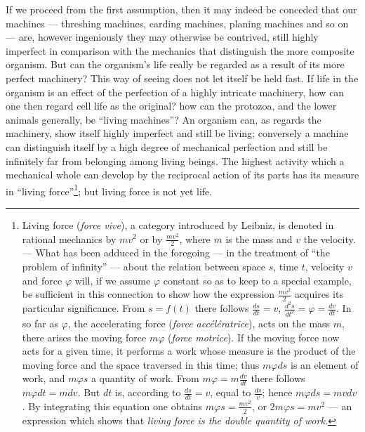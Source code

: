 \documentclass[12pt,a4paper]{book}
\begin{document}
If we proceed from the first assumption, then it may indeed be conceded that our
machines --- threshing machines, carding machines, planing machines and so on ---
are, however ingeniously they may otherwise be contrived, still highly imperfect in
comparison with the mechanics that distinguish the more composite organism. But can
the organism's life really be regarded as a result of its more perfect machinery?
This way of seeing does not let itself be held fast. If life in the organism is an
effect of the perfection of a highly intricate machinery, how can one then regard
cell life as the original? how can the protozoa, and the lower animals generally, be
``living machines''? An organism can, as regards the machinery, show itself highly
imperfect and still be living; conversely a machine can distinguish itself by a high
degree of mechanical perfection and still be infinitely far from belonging among
living beings. The highest activity which a mechanical whole can develop by the
reciprocal action of its parts has its measure in ``living
force''\footnote{Living force (\textit{force vive}), a category introduced by
Leibniz, is denoted in rational mechanics by $mv^2$ or by $\frac{mv^2}{2}$, where
$m$ is the mass and $v$ the velocity. --- What has been adduced in the foregoing
--- in the treatment of ``the problem of infinity'' --- about the relation between
space $s$, time $t$, velocity $v$ and force $\varphi$ will, if we assume $\varphi$
constant so as to keep to a special example, be sufficient in this connection to
show how the expression $\frac{mv^2}{2}$ acquires its particular significance. From
$s = f(t)$ there follows $\frac{ds}{dt} = v$, $\frac{d^2s}{dt^2} = \varphi =
\frac{dv}{dt}$. In so far as $\varphi$, the accelerating force
(\textit{force accélératrice}), acts on the mass $m$, there arises the moving force
$m\varphi$ (\textit{force motrice}). If the moving force now acts for a given time,
it performs a work whose measure is the product of the moving force and the space
traversed in this time; thus $m\varphi ds$ is an element of work, and $m\varphi s$
a quantity of work. From $m\varphi = m\frac{dv}{dt}$ there follows $m\varphi dt =
mdv$. But $dt$ is, according to $\frac{ds}{dt} = v$, equal to $\frac{ds}{v}$; hence
$m\varphi ds = mvdv$. By integrating this equation one obtains $m\varphi s =
\frac{mv^2}{2}$, or $2m\varphi s = mv^2$ --- an expression which shows that
\emph{living force is the double quantity of work.}}; but living force is not yet
life.
\end{document}
